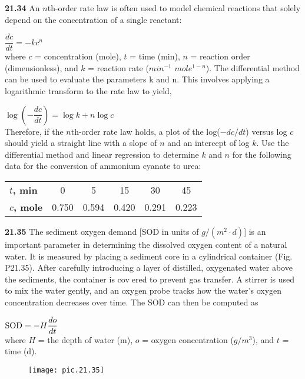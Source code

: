 \begin{multicols}{2}
\textbf{21.34} An $n$th-order rate law is often used to model chemical
reactions that solely depend on the concentration of a single
reactant:

$ \dfrac{dc}{dt} = -kc^{n} $\\
where $c$ = concentration (mole), $t$ = time (min), $n$ =
reaction order (dimensionless), and $k$ = reaction rate 
($min^{−1}$ $mole^{1−n}$). The differential method can be used to
evaluate the parameters k and n. This involves applying a
logarithmic transform to the rate law to yield,

$ \log \left(-\dfrac{dc}{dt} \right) = \log k + n \log c $\\
Therefore, if the $n$th-order rate law holds, a plot of the
log($−dc/dt$) versus log $c$ should yield a straight line with a
slope of $n$ and an intercept of log $k$. Use the differential
method and linear regression to determine $k$ and $n$ for the
following data for the conversion of ammonium cyanate to
urea:\\
\begin{tabular}{lccccc}
\hline

	\textbf{$t$, min} & 0 & 5 & 15 & 30 & 45\\

	\textbf{$c$, mole} & 0.750 & 0.594 & 0.420 & 0.291 & 0.223\\
	
\hline
\end{tabular}


\textbf{21.35} The sediment oxygen demand [SOD in units of
$g/(m^2 · d)$] is an important parameter in determining the
dissolved oxygen content of a natural water. It is measured
by placing a sediment core in a cylindrical container 
(Fig. P21.35). After carefully introducing a layer of distilled,
oxygenated water above the sediments, the container is covered to prevent gas transfer. A stirrer is used to mix the water
gently, and an oxygen probe tracks how the water’s oxygen
concentration decreases over time. The SOD can then be
computed as

$ \textnormal{SOD} = -H\dfrac{do}{dt} $\\
where $H$ = the depth of water (m), $o$ = oxygen concentration
($g/m^3$), and $t$ = time (d).
\end{multicols}
\pagebreak
\begin{figure}[hbt!]
	\texttt{[image: pic.21.35]}
	\label{pic.21.35}
\end{figure}\\
